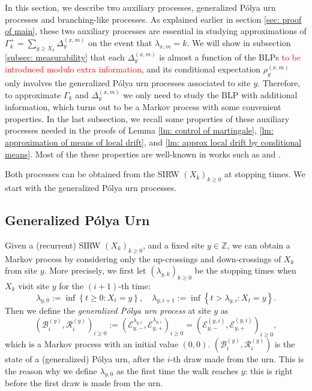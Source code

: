 \documentclass[twoside,12pt, a4paper]{article}
\numberwithin{equation}{section}
\theoremstyle{remark}
\newcommand{\edt}[1]{\textcolor{red}{#1}} %
\newcommand{\comment}[1]{\textcolor{blue}{(Comment: #1)}}
\begin{document}
	In this section, we describe two auxiliary processes, generalized P\'{o}lya urn processes and branching-like processes. As explained earlier in section \ref{sec: proof of main}, these two auxiliary processes are essential in studying approximations of $\Gamma_k^+= \sum_{y\geq X_k} \Delta_{y}^{(x,m)}$ on the event that $\lambda_{x,m} = k$. We will show in subsection \ref{subsec: measurability} that each $\Delta^{(x,m)}_{y}$ is almost a function of the BLPs \edt{to be introduced modulo extra information}, and its conditional expectation $\rho^{(x,m)}_{y}$ only involves the generalized P\'{o}lya urn processes associated to site $y$. Therefore, to approximate $\Gamma_k$ and $\Delta_{y}^{(x,m)}$ we only need to study the BLP with additional information, which turns out to be a Markov process with some convenient properties. In the last subsection, we recall some properties of these auxiliary processes needed in the proofs of Lemma \ref{lm: control of martingale}, \ref{lm: approximation of means of local drift}, and \ref{lm: approx local drift by conditional means}. Most of the these properties are well-known in works such as \cite{KP16} and \cite{KMP23}. 
	
	Both processes can be obtained from the SIRW $(X_k)_{k\geq 0}$ at stopping times. We start with the generalized P\'{o}lya urn processes. 
	
	\subsection{Generalized P\'{o}lya Urn}
	Given a (recurrent) SIRW $(X_k)_{k\geq 0}$, and a fixed site $y\in \mathbb{Z}$, we can obtain a Markov process by considering only the up-crossings and down-crossings of $X_k$ from site $y$. More precisely, we first let $(\lambda_{y,k})_{k\geq 0}$ be the stopping times when $X_k$ visit site $y$ for the $\left( i+1 \right) $-th time:
	\[
	\lambda_{y,0} :=\inf\left\{ t\geq 0: X_t = y \right\} , \quad \lambda_{y,i+1} := \inf\left\{ t> \lambda_{y, i}: X_t = y \right\}.
	\] 
	Then we define the \textit{generalized P\'olya urn process} at site $y$ as 
	\begin{equation} \label{eq: RW to GPU}
		\left(\mathcal{B}^{(y)}_{i},\mathcal{R}^{(y)}_{i} \right)_{i\ge 0}
		:=\left(\mathcal{E}^{\lambda_{y,i}}_{y,-}, \mathcal{E}^{\lambda_{y,i}}_{y,+}\right)_{i\geq 0} 
		=  \left(\mathcal{E}^{(y,i)}_{y,-}, \mathcal{E}^{(y,i)}_{y,+}\right)_{i\geq 0},
	\end{equation}
	which is a Markov process with an initial value $(0,0)$. 
	$\left(\mathcal{B}_{i}^{(y)},\mathcal{R}_{i}^{(y)} \right)$ is the state of a (generalized) P\'olya urn, after the $i$-th draw made from the urn. This is the reason why we define $\lambda_{y, 0}$ as the first time the walk reaches $y$: this is right before the first draw is made from the urn. 
\end{document}
